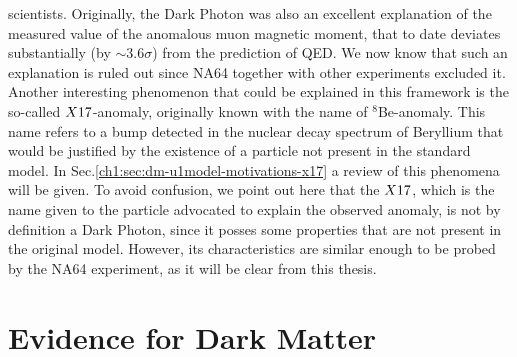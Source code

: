 scientists. Originally, the Dark Photon was also an excellent explanation of the measured value of the anomalous muon magnetic moment, that to date deviates substantially (by $\sim$3.6$\sigma$) from the prediction of QED. We now know that such an explanation is ruled out since NA64 together with other experiments excluded it. Another interesting phenomenon that could be explained in this framework is the so-called $X17$-anomaly, originally known with the name of $^8$Be-anomaly. This name refers to a bump detected in the nuclear decay spectrum of Beryllium that would be justified by the existence of a particle not present in the standard model. In Sec.\ref{ch1:sec:dm-u1model-motivations-x17} a review of this phenomena will be given. To avoid confusion, we point out here that the $X17$, which is the name given to the particle advocated to explain the observed anomaly, is not by definition a Dark Photon, since it posses some properties that are not present in the original model. However, its characteristics are similar enough to be probed by the NA64 experiment, as it will be clear from this thesis.


\section{Evidence for Dark Matter}
\label{ch1:sec:dm-evidence}

